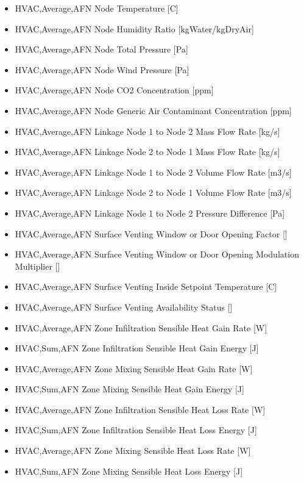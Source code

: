 \begin{itemize}
\item
  HVAC,Average,AFN Node Temperature {[}C{]}
\item
  HVAC,Average,AFN Node Humidity Ratio {[}kgWater/kgDryAir{]}
\item
  HVAC,Average,AFN Node Total Pressure {[}Pa{]}
\item
  HVAC,Average,AFN Node Wind Pressure {[}Pa{]}
\item
  HVAC,Average,AFN Node CO2 Concentration {[}ppm{]}
\item
  HVAC,Average,AFN Node Generic Air Contaminant Concentration {[}ppm{]}
\item
  HVAC,Average,AFN Linkage Node 1 to Node 2 Mass Flow Rate {[}kg/s{]}
\item
  HVAC,Average,AFN Linkage Node 2 to Node 1 Mass Flow Rate {[}kg/s{]}
\item
  HVAC,Average,AFN Linkage Node 1 to Node 2 Volume Flow Rate {[}m3/s{]}
\item
  HVAC,Average,AFN Linkage Node 2 to Node 1 Volume Flow Rate {[}m3/s{]}
\item
  HVAC,Average,AFN Linkage Node 1 to Node 2 Pressure Difference {[}Pa{]}
\item
  HVAC,Average,AFN Surface Venting Window or Door Opening Factor {[]}
\item
  HVAC,Average,AFN Surface Venting Window or Door Opening Modulation Multiplier {[]}
\item
  HVAC,Average,AFN Surface Venting Inside Setpoint Temperature {[}C{]}
\item
  HVAC,Average,AFN Surface Venting Availability Status {[]}
\item
  HVAC,Average,AFN Zone Infiltration Sensible Heat Gain Rate {[}W{]}
\item
  HVAC,Sum,AFN Zone Infiltration Sensible Heat Gain Energy {[}J{]}
\item
  HVAC,Average,AFN Zone Mixing Sensible Heat Gain Rate {[}W{]}
\item
  HVAC,Sum,AFN Zone Mixing Sensible Heat Gain Energy {[}J{]}
\item
  HVAC,Average,AFN Zone Infiltration Sensible Heat Loss Rate {[}W{]}
\item
  HVAC,Sum,AFN Zone Infiltration Sensible Heat Loss Energy {[}J{]}
\item
  HVAC,Average,AFN Zone Mixing Sensible Heat Loss Rate {[}W{]}
\item
  HVAC,Sum,AFN Zone Mixing Sensible Heat Loss Energy {[}J{]}

\end{itemize}
